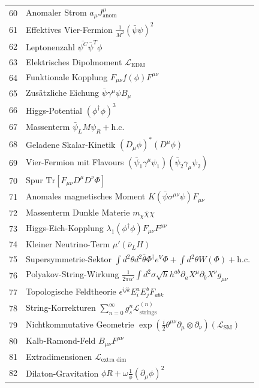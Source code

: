 \documentclass[11pt,a4paper]{article}
\begin{document}
\begin{longtable}{r l}
		60 & Anomaler Strom \(a_\mu J^\mu_{\text{anom}}\) \\
		61 & Effektives Vier-Fermion \(\frac{1}{M^2}(\bar{\psi}\psi)^2\) \\
		62 & Leptonenzahl \(\bar{\psi^C}\bar{\psi}^T\phi\) \\
		63 & Elektrisches Dipolmoment \(\mathcal{L}_{\text{EDM}}\) \\
		64 & Funktionale Kopplung \(F_{\mu\nu}f(\phi)F^{\mu\nu}\) \\
		65 & Zusätzliche Eichung \(\bar{\psi}\gamma^\mu\psi B_\mu\) \\
		66 & Higgs-Potential \((\phi^\dagger\phi)^3\) \\
		67 & Massenterm \(\bar{\psi}_L M \psi_R + \text{h.c.}\) \\
		68 & Geladene Skalar-Kinetik \((D_\mu\phi)^*(D^\mu\phi)\) \\
		69 & Vier-Fermion mit Flavours \((\bar{\psi}_1\gamma^\mu\psi_1)(\bar{\psi}_2\gamma_\mu\psi_2)\) \\
		70 & Spur \(\mathrm{Tr}[F_{\mu\nu}D^\mu D^\nu\Phi]\) \\
		71 & Anomales magnetisches Moment \(K(\bar{\psi}\sigma^{\mu\nu}\psi)F_{\mu\nu}\) \\
		72 & Massenterm Dunkle Materie \(m_\chi\bar{\chi}\chi\) \\
		73 & Higgs-Eich-Kopplung \(\lambda_1(\phi^\dagger\phi)F_{\mu\nu}F^{\mu\nu}\) \\
		74 & Kleiner Neutrino-Term \(\mu'(\bar{\nu}_L H)\) \\
		75 & Supersymmetrie-Sektor \(\int d^2\theta d^2\bar{\theta}\Phi^\dagger e^V\Phi + \int d^2\theta W(\Phi) + \text{h.c.}\) \\
		76 & Polyakov-String-Wirkung \(\frac{1}{2\pi\alpha'}\int d^2\sigma\sqrt{h}h^{ab}\partial_a X^\mu\partial_b X^\nu g_{\mu\nu}\) \\
		77 & Topologische Feldtheorie \(\epsilon^{ijk}E_i^a E_j^b F_{ab k}\) \\
		78 & String-Korrekturen \(\sum_{n=0}^\infty g_s^n \mathcal{L}^{(n)}_{\text{strings}}\) \\
		79 & Nichtkommutative Geometrie \(\exp\left(\frac{i}{2}\theta^{\mu\nu}\partial_\mu\otimes\partial_\nu\right)(\mathcal{L}_{\text{SM}})\) \\
		80 & Kalb-Ramond-Feld \(B_{\mu\nu}F^{\mu\nu}\) \\
		81 & Extradimensionen \(\mathcal{L}_{\text{extra dim}}\) \\
		82 & Dilaton-Gravitation \(\phi R + \omega\frac{1}{\phi}(\partial_\mu\phi)^2\) \\

\end{longtable}
\end{document}
